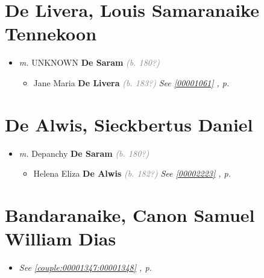 \documentclass[10pt, openany]{book}
\begin{document}
\chapter{De Livera, Louis Samaranaike Tennekoon}
\label{00001078}
\textcolor{slmaroon}{\textit{}}
\begin{itemize}
\item{\textit{m.} UNKNOWN \textbf{De Saram} \textcolor{gray}{\textit{(b. 180?)}}   \label{couple:00001078:00001079} \begin{itemize}
\item{Jane Maria \textbf{De Livera} \textcolor{gray}{\textit{(b. 183?)}} \textcolor{slteal}{\textit{See  \autoref{00001061} \textit{, p. \pageref{00001061} }}}}
\end{itemize}}
\end{itemize}
    
\chapter{De Alwis, Sieckbertus Daniel}
\label{00002221}
\textcolor{slmaroon}{\textit{}}
\begin{itemize}
\item{\textit{m.} Depanchy \textbf{De Saram} \textcolor{gray}{\textit{(b. 180?)}}   \label{couple:00002221:00002222} \begin{itemize}
\item{Helena Eliza \textbf{De Alwis} \textcolor{gray}{\textit{(b. 182?)}} \textcolor{slteal}{\textit{See  \autoref{00002223} \textit{, p. \pageref{00002223} }}}}
\end{itemize}}
\end{itemize}
   
\chapter{Bandaranaike, Canon Samuel William Dias}
\label{00001347}
\textcolor{slmaroon}{\textit{}}
\begin{itemize}
\item{\textcolor{slteal}{\textit{See  \autoref{couple:00001347:00001348} \textit{, p. \pageref{couple:00001347:00001348} }}}}
\end{itemize}
    
\end{document}
